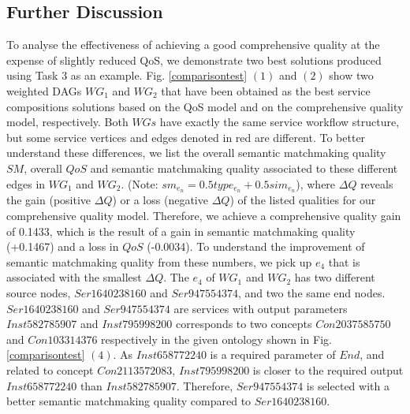 \subsection{Further Discussion}\label{discuss1}
To analyse the effectiveness of achieving a good comprehensive quality at the expense of slightly reduced QoS, we demonstrate two best solutions produced using Task 3 as an example. Fig. \ref{comparisontest} $(1)$ and $(2)$ show two weighted DAGs $WG_1$ and $WG_2$ that have been obtained as the best service compositions solutions based on the QoS model and on the comprehensive quality model, respectively. Both $WGs$ have exactly the same service workflow structure, but some service vertices and edges denoted in red are different. To better understand these differences, we list the overall semantic matchmaking quality $SM$,  overall $QoS$ and semantic matchmaking quality associated to these different edges in $WG_1$ and $WG_2$. (Note: $sm_{e_n} = 0.5type_{e_n} + 0.5 sim_{e_n}$), where $\Delta Q$ reveals the gain (positive $\Delta Q$) or a loss (negative $\Delta Q$) of the listed qualities for our comprehensive quality model. Therefore, we achieve a comprehensive quality gain of 0.1433, which is the result of a gain in semantic matchmaking quality (+0.1467) and a loss in $QoS$ (-0.0034). To understand the improvement of semantic matchmaking quality from these numbers, we pick up $e_4$ that is associated with the smallest $\Delta Q$. The $e_4$ of $WG_1$ and $WG_2$ has two different source nodes, $Ser1640238160$ and $Ser947554374$, and two the same end nodes. $Ser1640238160$ and $Ser947554374$ are services with output parameters $Inst582785907$ and  $Inst795998200$ corresponds to two concepts $Con2037585750$ and $Con103314376$ respectively in the given ontology shown in Fig. \ref{comparisontest} $(4)$. As $Inst658772240$ is a required parameter of $End$, and related to concept $Con2113572083$, $Inst795998200$ is closer to the required output $Inst658772240$ than $Inst582785907$. Therefore,  $Ser947554374$ is selected with a better semantic matchmaking quality compared to $Ser1640238160$.

